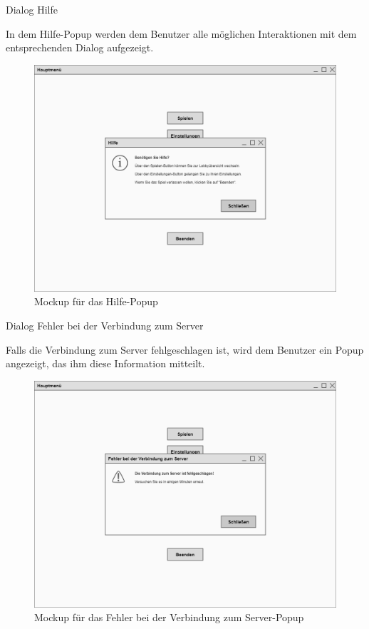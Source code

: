 Dialog \glqq{}Hilfe\grqq{}

In dem Hilfe-Popup werden dem Benutzer alle möglichen Interaktionen mit dem entsprechenden Dialog aufgezeigt.

\begin{figure}
  \centering
  \includegraphics[width=\textwidth]{Meilenstein03/Hilfe_Mockup.png}
  \caption{Mockup für das Hilfe-Popup}
\end{figure}

Dialog \glqq{}Fehler bei der Verbindung zum Server\grqq{}

Falls die Verbindung zum Server fehlgeschlagen ist, wird dem Benutzer ein Popup angezeigt, das ihm diese Information mitteilt.

\begin{figure}
  \centering
  \includegraphics[width=\textwidth]{Meilenstein03/FehlerBeiDerVerbindungZumServer_Mockup.png}
  \caption{Mockup für das Fehler bei der Verbindung zum Server-Popup}
\end{figure}

